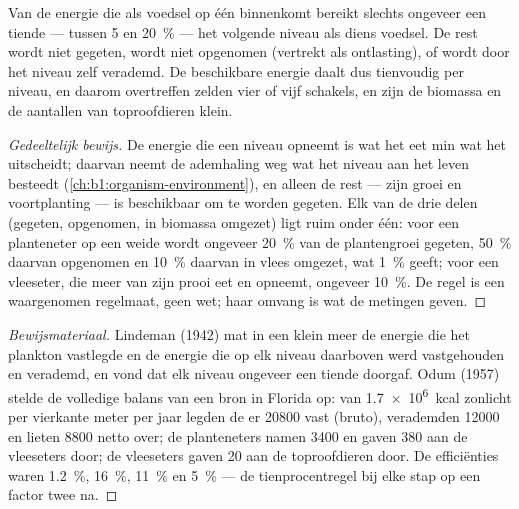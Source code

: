 \begin{theorem}[De tienprocentregel]\label{thm:b1:ecosystem-organization:lindeman}
Van de energie die als voedsel op één  binnenkomt bereikt
slechts ongeveer een tiende --- tussen \qty{5}{} en \qty{20}{\%} --- het
volgende niveau als diens voedsel. De rest wordt niet gegeten, wordt niet
opgenomen (vertrekt als ontlasting), of wordt door het niveau zelf verademd.
De beschikbare energie daalt dus tienvoudig per niveau, en daarom overtreffen
 zelden vier of vijf schakels, en zijn de biomassa en de
aantallen van toproofdieren klein.
\end{theorem}
\begin{proof}[Gedeeltelijk bewijs]
De energie die een niveau opneemt is wat het eet min wat het uitscheidt;
daarvan neemt de ademhaling weg wat het niveau aan het leven besteedt
(\cref{ch:b1:organism-environment}), en alleen de rest --- zijn groei en
voortplanting --- is beschikbaar om te worden gegeten. Elk van de drie delen
(gegeten, opgenomen, in biomassa omgezet) ligt ruim onder één: voor een
planteneter op een weide wordt ongeveer \qty{20}{\%} van de plantengroei
gegeten, \qty{50}{\%} daarvan opgenomen en \qty{10}{\%} daarvan in vlees
omgezet, wat \qty{1}{\%} geeft; voor een vleeseter, die meer van zijn prooi
eet en opneemt, ongeveer \qty{10}{\%}. De regel is een waargenomen
regelmaat, geen wet; haar omvang is wat de metingen geven.
\end{proof}
\begin{proof}[Bewijsmateriaal]
Lindeman (1942) mat in een klein meer de energie die het plankton vastlegde
en de energie die op elk niveau daarboven werd vastgehouden en verademd, en
vond dat elk niveau ongeveer een tiende doorgaf. Odum (1957) stelde de
volledige balans van een bron in Florida op: van \qty{1.7e6}{kcal} zonlicht
per vierkante meter per jaar legden de  er \num{20800} vast
(bruto), verademden \num{12000} en lieten \num{8800} netto over; de
planteneters namen \num{3400} en gaven \num{380} aan de vleeseters door; de
vleeseters gaven \num{20} aan de toproofdieren door. De efficiënties waren
\qty{1.2}{\%}, \qty{16}{\%}, \qty{11}{\%} en \qty{5}{\%} --- de
tienprocentregel bij elke stap op een factor twee na.
\end{proof}

